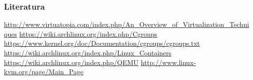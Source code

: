 \documentclass[t]{beamer}
\begin{document}
\begin{frame}
	\frametitle{Literatura}
	\url{http://www.virtuatopia.com/index.php/An_Overview_of_Virtualization_Techniques}
	\vfill
	\url{https://wiki.archlinux.org/index.php/Cgroups}\\
	\url{https://www.kernel.org/doc/Documentation/cgroups/cgroups.txt}
	\vfill
	\url{https://wiki.archlinux.org/index.php/Linux_Containers}
	\vfill
	\url{https://wiki.archlinux.org/index.php/QEMU}
	\vfill
	\url{http://www.linux-kvm.org/page/Main_Page}
\end{frame}
\end{document}
